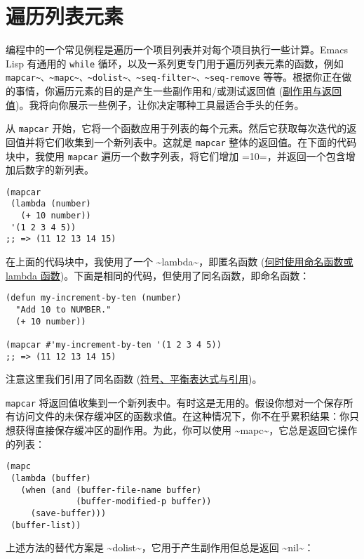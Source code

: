 \documentclass[11pt]{ctexart}
\begin{document}
\section{遍历列表元素}
\label{sec:org94bd4fd}
编程中的一个常见例程是遍历一个项目列表并对每个项目执行一些计算。Emacs Lisp 有通用的 \texttt{while} 循环，以及一系列更专门用于遍历列表元素的函数，例如 \texttt{mapcar\textasciitilde{}、\textasciitilde{}mapc\textasciitilde{}、\textasciitilde{}dolist\textasciitilde{}、\textasciitilde{}seq-filter\textasciitilde{}、\textasciitilde{}seq-remove} 等等。根据你正在做的事情，你遍历元素的目的是产生一些副作用和/或测试返回值 (\hyperref[sec:org7601617]{副作用与返回值})。我将向你展示一些例子，让你决定哪种工具最适合手头的任务。

从 \texttt{mapcar} 开始，它将一个函数应用于列表的每个元素。然后它获取每次迭代的返回值并将它们收集到一个新列表中。这就是 \texttt{mapcar} 整体的返回值。在下面的代码块中，我使用 \texttt{mapcar} 遍历一个数字列表，将它们增加 =10=，并返回一个包含增加后数字的新列表。

\begin{verbatim}
(mapcar
 (lambda (number)
   (+ 10 number))
 '(1 2 3 4 5))
;; => (11 12 13 14 15)
\end{verbatim}

在上面的代码块中，我使用了一个 \textasciitilde{}lambda\textasciitilde{}，即匿名函数 (\hyperref[sec:orgf242639]{何时使用命名函数或 lambda 函数})。下面是相同的代码，但使用了同名函数，即命名函数：

\begin{verbatim}
(defun my-increment-by-ten (number)
  "Add 10 to NUMBER."
  (+ 10 number))

(mapcar #'my-increment-by-ten '(1 2 3 4 5))
;; => (11 12 13 14 15)
\end{verbatim}

注意这里我们引用了同名函数 (\hyperref[sec:orgb51d706]{符号、平衡表达式与引用})。

\texttt{mapcar} 将返回值收集到一个新列表中。有时这是无用的。假设你想对一个保存所有访问文件的未保存缓冲区的函数求值。在这种情况下，你不在乎累积结果：你只想获得直接保存缓冲区的副作用。为此，你可以使用 \textasciitilde{}mapc\textasciitilde{}，它总是返回它操作的列表：

\begin{verbatim}
(mapc
 (lambda (buffer)
   (when (and (buffer-file-name buffer)
              (buffer-modified-p buffer))
     (save-buffer)))
 (buffer-list))
\end{verbatim}

上述方法的替代方案是 \textasciitilde{}dolist\textasciitilde{}，它用于产生副作用但总是返回 \textasciitilde{}nil\textasciitilde{}：
\end{document}
